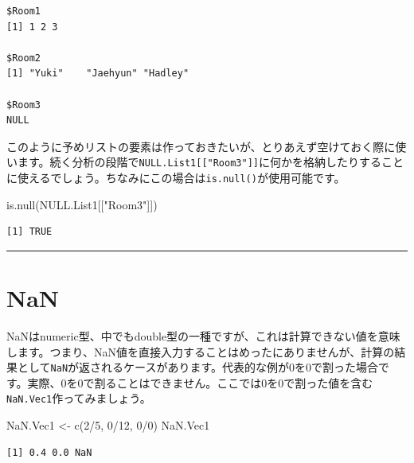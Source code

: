 \documentclass[
  a4paper,
  pandoc,
  ja=standard,
  jafont=haranoaji]{bxjsbook}
\newenvironment{Shaded}{\begin{snugshade}}{\end{snugshade}}
\newcommand{\DecValTok}[1]{\textcolor[rgb]{0.68,0.00,0.00}{#1}}
\newcommand{\FunctionTok}[1]{\textcolor[rgb]{0.28,0.35,0.67}{#1}}
\newcommand{\NormalTok}[1]{\textcolor[rgb]{0.00,0.48,0.65}{#1}}
\newcommand{\OtherTok}[1]{\textcolor[rgb]{0.00,0.48,0.65}{#1}}
\newcommand{\SpecialCharTok}[1]{\textcolor[rgb]{0.37,0.37,0.37}{#1}}
\newcommand{\StringTok}[1]{\textcolor[rgb]{0.13,0.47,0.30}{#1}}
\begin{document}
\begin{verbatim}
$Room1
[1] 1 2 3

$Room2
[1] "Yuki"    "Jaehyun" "Hadley" 

$Room3
NULL
\end{verbatim}

このように予めリストの要素は作っておきたいが、とりあえず空けておく際に使います。続く分析の段階で\texttt{NULL.List1{[}{[}"Room3"{]}{]}}に何かを格納したりすることに使えるでしょう。ちなみにこの場合は\texttt{is.null()}が使用可能です。

\begin{Shaded}
\begin{Highlighting}[numbers=left,,]
\FunctionTok{is.null}\NormalTok{(NULL.List1[[}\StringTok{"Room3"}\NormalTok{]])}
\end{Highlighting}
\end{Shaded}

\begin{verbatim}
[1] TRUE
\end{verbatim}

\begin{center}\rule{0.5\linewidth}{0.5pt}\end{center}

\hypertarget{sec-type_nan}{%
\section{NaN}\label{sec-type_nan}}

NaNはnumeric型、中でもdouble型の一種ですが、これは計算できない値を意味します。つまり、NaN値を直接入力することはめったにありませんが、計算の結果として\texttt{NaN}が返されるケースがあります。代表的な例が0を0で割った場合です。実際、0を0で割ることはできません。ここでは0を0で割った値を含む\texttt{NaN.Vec1}作ってみましょう。

\begin{Shaded}
\begin{Highlighting}[numbers=left,,]
\NormalTok{NaN.Vec1 }\OtherTok{\textless{}{-}} \FunctionTok{c}\NormalTok{(}\DecValTok{2}\SpecialCharTok{/}\DecValTok{5}\NormalTok{, }\DecValTok{0}\SpecialCharTok{/}\DecValTok{12}\NormalTok{, }\DecValTok{0}\SpecialCharTok{/}\DecValTok{0}\NormalTok{)}
\NormalTok{NaN.Vec1}
\end{Highlighting}
\end{Shaded}

\begin{verbatim}
[1] 0.4 0.0 NaN
\end{verbatim}
\end{document}
